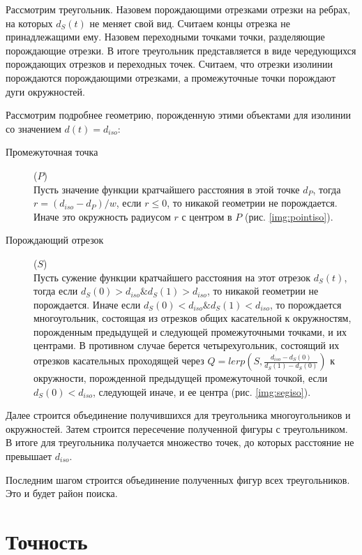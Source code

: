 Рассмотрим треугольник. Назовем порождающими отрезками отрезки на ребрах,
на которых $d_S(t)$ не меняет свой вид. Считаем концы отрезка не
принадлежащими ему. Назовем переходными точками точки,
разделяющие порождающие отрезки. В итоге треугольник представляется в виде
чередующихся порождающих отрезков и переходных точек. Считаем,
что отрезки изолинии порождаются порождающими отрезками, а
промежуточные точки порождают дуги окружностей.

Рассмотрим подробнее геометрию, порожденную этими объектами для
изолинии со значением $d(t) = d_{iso}$:
\begin{description}
\item[Промежуточная точка] ($P$) \\
Пусть значение функции кратчайшего расстояния в этой точке $d_P$, тогда
$r = (d_{iso} - d_P)/w$, если $r \leq 0$, то никакой геометрии не порождается.
Иначе это окружность радиусом $r$ с центром в $P$ (рис. \ref{img:pointiso}).
\item[Порождающий отрезок] ($S$) \\
Пусть сужение функции кратчайшего расстояния на этот отрезок $d_S(t)$, тогда
если $d_S(0) > d_{iso} \& d_S(1) > d_{iso}$, то никакой геометрии не порождается.
Иначе если $d_S(0) < d_{iso} \& d_S(1) < d_{iso}$, то порождается многоугольник,
состоящая из отрезков общих касательной к окружностям, порожденным предыдущей
и следующей промежуточными точками, и их центрами.
В противном случае берется четырехугольник, состоящий их отрезков касательных
проходящей через $Q = lerp(S, \frac{d_{iso}-d_S(0)}{d_S(1) - d_S(0)})$ к
окружности, порожденной предыдущей промежуточной точкой,
если $d_S(0) < d_{iso}$, следующей иначе, и ее центра (рис. \ref{img:segiso}).
\end{description}


Далее строится объединение получившихся для треугольника
многоугольников и окружностей. Затем строится пересечение полученной фигуры
с треугольником. В итоге для треугольника получается множество точек,
до которых расстояние не превышает $d_{iso}$.

Последним шагом строится объединение полученных фигур всех треугольников.
Это и будет район поиска.

\FloatBarrier
\section{Точность}

